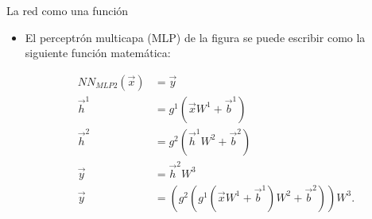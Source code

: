 \documentclass[handout]{beamer}
\begin{document}
\begin{frame}{La red como una función}
\begin{scriptsize}
\begin{itemize}
\item El perceptrón multicapa (MLP) de la figura se puede escribir como la siguiente función matemática:
\begin{center}
\begin{equation}
\begin{split}
NN_{MLP2}(\vec{x}) & =  \vec{y}  \\
\vec{h}^{1} &  = g^{1}(\vec{x}W^{1}+\vec{b}^{1}) \\
\vec{h}^{2} &  = g^{2}(\vec{h}^{1}W^{2}+\vec{b}^{2}) \\
\vec{y} &  = \vec{h}^{2}W^{3}\\
\vec{y} &  = (g^2(g^1(\vec{x}W^{1}+\vec{b}^{1})W^2+\vec{b}^2))W^3.\\
\end{split}
\end{equation}
\end{center}

\end{itemize}


\end{scriptsize}
\end{frame}
\end{document}
